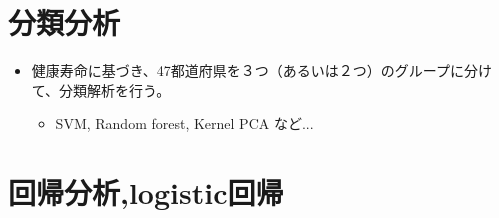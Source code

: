 \section{分類分析}
\begin{itemize} \setlength{\itemsep}{-0.5mm} \setlength{\parskip}{-0.5mm}
	\item 健康寿命に基づき、47都道府県を３つ（あるいは２つ）のグループに分けて、分類解析を行う。
	      \begin{itemize} \setlength{\itemsep}{-0.5mm} \setlength{\parskip}{-0.5mm}
		      \item SVM, Random forest, Kernel PCA など...
	      \end{itemize}

\end{itemize}


\section{回帰分析,logistic回帰}
